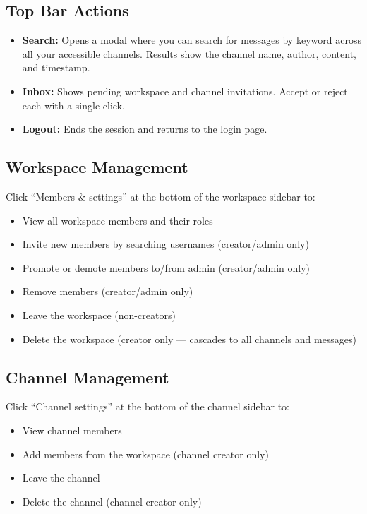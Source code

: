 \documentclass[11pt]{article}
\begin{document}
\subsection{Top Bar Actions}

\begin{itemize}
    \item \textbf{Search:} Opens a modal where you can search for messages by keyword across all your accessible channels. Results show the channel name, author, content, and timestamp.
    \item \textbf{Inbox:} Shows pending workspace and channel invitations. Accept or reject each with a single click.
    \item \textbf{Logout:} Ends the session and returns to the login page.
\end{itemize}

\subsection{Workspace Management}

Click ``Members \& settings'' at the bottom of the workspace sidebar to:
\begin{itemize}
    \item View all workspace members and their roles
    \item Invite new members by searching usernames (creator/admin only)
    \item Promote or demote members to/from admin (creator/admin only)
    \item Remove members (creator/admin only)
    \item Leave the workspace (non-creators)
    \item Delete the workspace (creator only --- cascades to all channels and messages)
\end{itemize}

\subsection{Channel Management}

Click ``Channel settings'' at the bottom of the channel sidebar to:
\begin{itemize}
    \item View channel members
    \item Add members from the workspace (channel creator only)
    \item Leave the channel
    \item Delete the channel (channel creator only)
\end{itemize}
\end{document}
